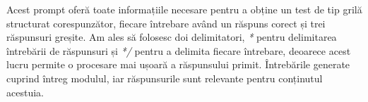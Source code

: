 Acest prompt oferă toate informațiile necesare pentru a obține un test de tip grilă structurat corespunzător, fiecare întrebare având un răspuns corect și trei răspunsuri greșite. Am ales să 
folosesc doi delimitatori, \textit{*} pentru delimitarea întrebării de răspunsuri și \textit{*/} pentru a delimita fiecare întrebare, deoarece acest lucru permite o procesare mai ușoară a 
răspunsului primit. Întrebările generate cuprind întreg modulul, iar răspunsurile sunt relevante pentru conținutul acestuia.